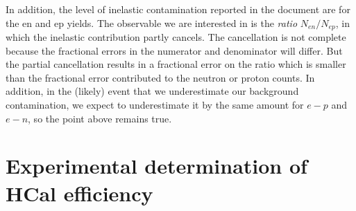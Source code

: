 \documentclass[11pt]{article}
\begin{document}
In addition, the level of inelastic contamination reported in the document are for the en and ep yields.
The observable we are interested in is the {\it ratio} $N_{en}/N_{ep}$, in which the inelastic contribution partly cancels.
The cancellation is not complete because the fractional errors in the numerator and 
denominator will differ.
But the partial cancellation results in a fractional error on the ratio which is smaller than the fractional error contributed to the neutron or proton counts.
In addition, in the (likely) event that we underestimate our background contamination,
we expect to underestimate it by the same amount for $e-p$ and $e-n$, so the point above remains true.\\

\newpage

\section*{Experimental determination of HCal efficiency}
\end{document}
